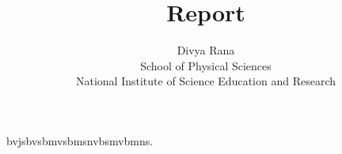 \documentclass[12pt,a4paper]{report}
\begin{document}
\title{\textbf{Report}}
\author{Divya Rana \\ School of Physical Sciences\\National Institute of Science Education and Research}
\maketitle
\newpage
bvjsbvsbmvsbmsnvbsmvbmns.
\end{document}
